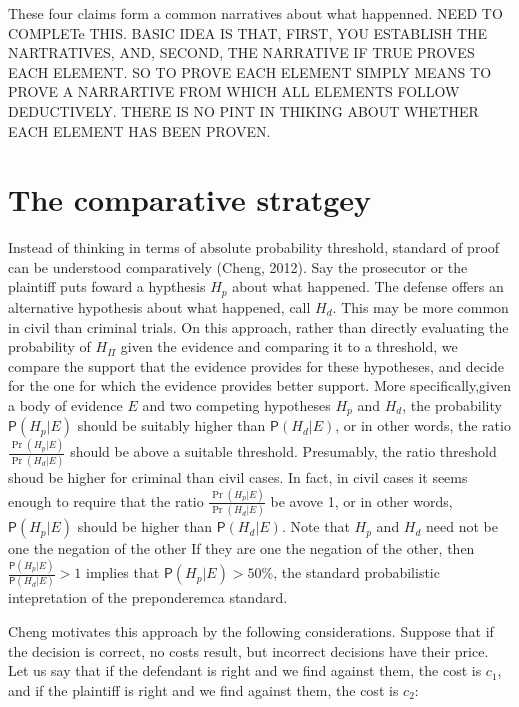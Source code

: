 \documentclass[10pt,dvipsnames,enabledeprecatedfontcommands]{scrartcl}
\newcommand{\pr}[1]{\mathsf{P}(#1)}
\begin{document}
\noindent These four claims form a common narratives about what
happenned. NEED TO COMPLETe THIS. BASIC IDEA IS THAT, FIRST, YOU
ESTABLISH THE NARTRATIVES, AND, SECOND, THE NARRATIVE IF TRUE PROVES
EACH ELEMENT. SO TO PROVE EACH ELEMENT SIMPLY MEANS TO PROVE A
NARRARTIVE FROM WHICH ALL ELEMENTS FOLLOW DEDUCTIVELY. THERE IS NO PINT
IN THIKING ABOUT WHETHER EACH ELEMENT HAS BEEN PROVEN.

\hypertarget{the-comparative-stratgey}{%
\section{The comparative stratgey}\label{the-comparative-stratgey}}

Instead of thinking in terms of absolute probability threshold, standard
of proof can be understood comparatively (Cheng, 2012). Say the
prosecutor or the plaintiff puts foward a hypthesis \(H_p\) about what
happened. The defense offers an alternative hypothesis about what
happened, call \(H_d\). This may be more common in civil than criminal
trials. On this approach, rather than directly evaluating the
probability of \(H_\Pi\) given the evidence and comparing it to a
threshold, we compare the support that the evidence provides for these
hypotheses, and decide for the one for which the evidence provides
better support. More specifically,given a body of evidence \(E\) and two
competing hypotheses \(H_p\) and \(H_d\), the probability
\(\pr{H_p | E}\) should be suitably higher than \(\pr{H_d | E}\), or in
other words, the ratio \(\frac{\Pr(H_p | E)}{\Pr(H_d | E)}\) should be
above a suitable threshold. Presumably, the ratio threshold shoud be
higher for criminal than civil cases. In fact, in civil cases it seems
enough to require that the ratio \(\frac{\Pr(H_p | E)}{\Pr(H_d | E)}\)
be avove 1, or in other words, \(\pr{H_p | E}\) should be higher than
\(\pr{H_d | E}\). Note that \(H_p\) and \(H_d\) need not be one the
negation of the other If they are one the negation of the other, then
\(\frac{\pr{H_p | E}}{\pr{H_d | E}}>1\) implies that
\(\pr{H_p | E}>50\%\), the standard probabilistic intepretation of the
preponderemca standard.

Cheng motivates this approach by the following considerations. Suppose
that if the decision is correct, no costs result, but incorrect
decisions have their price. Let us say that if the defendant is right
and we find against them, the cost is \(c_1\), and if the plaintiff is
right and we find against them, the cost is \(c_2\):
\end{document}
